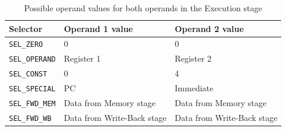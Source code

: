 \begin{table}[htbp]
    \center
    \begin{tabular}{|l|l|l|}
        \hline
        Selector               & Operand 1 value           & Operand 2 value           \\ \hline
        \texttt{SEL\_ZERO}     & 0                         & 0                         \\ \hline
        \texttt{SEL\_OPERAND}  & Register 1                & Register 2                \\ \hline
        \texttt{SEL\_CONST}    & 0                         & 4                         \\ \hline
        \texttt{SEL\_SPECIAL}  & PC                        & Immediate                 \\ \hline
        \texttt{SEL\_FWD\_MEM} & Data from Memory stage    & Data from Memory stage    \\ \hline
        \texttt{SEL\_FWD\_WB}  & Data from Write-Back stage & Data from Write-Back stage \\ \hline
    \end{tabular}
    \caption{Possible operand values for both operands in the Execution stage}
    \label{tab:exe-operands}
\end{table}
